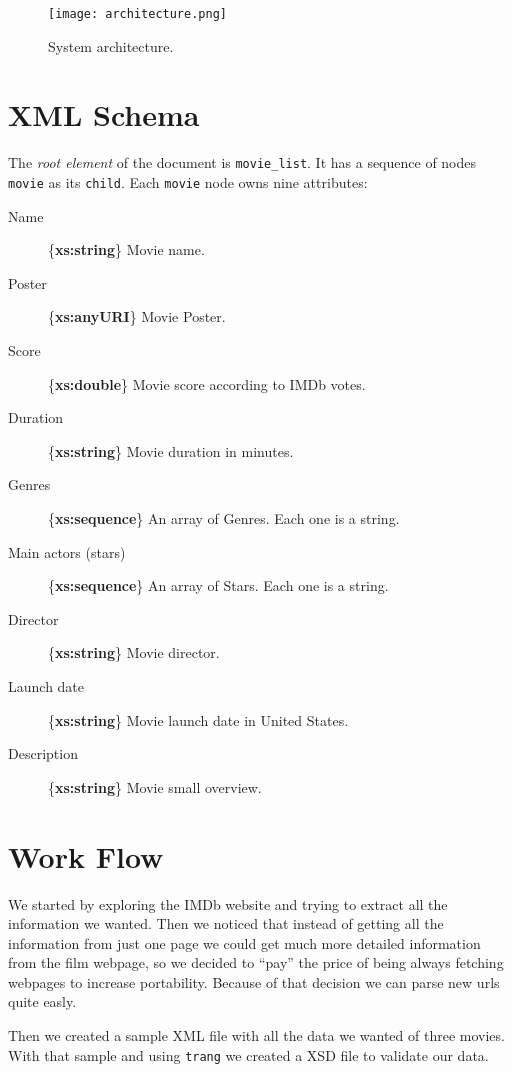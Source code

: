 \documentclass[a4paper]{article}
\begin{document}
\begin{figure}[h!]
	\centering
	\texttt{[image: architecture.png]}
	\caption{System architecture.}
\end{figure}

\clearpage
\section{XML Schema}
\indent \indent The \emph{root element} of the document is \texttt{movie\_list}. It has a sequence of nodes \texttt{movie} as its \texttt{child}.
Each \texttt{movie} node owns nine attributes:
\begin{description}
	\item [Name] \{\textbf{xs:string}\}
		Movie name.
	\item [Poster] \{\textbf{xs:anyURI}\}
		Movie Poster.
	\item [Score] \{\textbf{xs:double}\}
		Movie score according to IMDb votes.
	\item [Duration] \{\textbf{xs:string}\}
		Movie duration in minutes.
	\item [Genres] \{\textbf{xs:sequence}\}
		An array of Genres. Each one is a string.
	\item [Main actors (stars)] \{\textbf{xs:sequence}\}
		An array of Stars. Each one is a string.
	\item [Director] \{\textbf{xs:string}\}
		Movie director.
	\item [Launch date] \{\textbf{xs:string}\}
		Movie launch date in United States.
	\item [Description] \{\textbf{xs:string}\}
		Movie small overview.
\end{description}

\clearpage
\section{Work Flow}
\indent \indent We started by exploring the IMDb website and trying to extract all the information we wanted. Then we noticed that instead of getting all the information from just one page we could get much more detailed information from the film webpage, so we decided to ``pay'' the price of being always fetching webpages to increase portability. Because of that decision we can parse new urls quite easly.

Then we created a sample XML file with all the data we wanted of three movies. With that sample and using \texttt{trang} we created a XSD file to validate our data.
\end{document}
